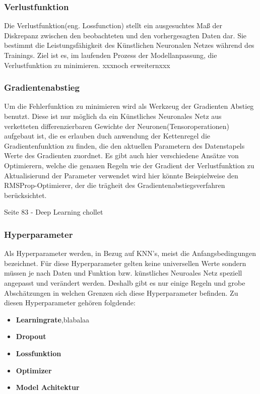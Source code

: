\subsubsection{Verlustfunktion}
Die Verlustfunktion(eng. Lossfunction) stellt ein ausgesuchtes Maß der Diskrepanz zwischen den beobachteten und den vorhergesagten Daten dar. Sie bestimmt die Leistungsfähigkeit des Künstlichen Neuronalen Netzes während des Trainings. Ziel ist es, im laufenden Prozess der Modellanpassung, die Verlustfunktion zu minimieren. xxxnoch erweiternxxx

\subsubsection{Gradientenabstieg}
Um die Fehlerfunktion zu minimieren wird als Werkzeug der Gradienten Abstieg benutzt. Diese ist nur möglich da ein Künstliches Neuronales Netz aus verketteten differenzierbaren Gewichte der Neuronen(Tensoroperationen) aufgebaut ist, die es erlauben duch anwendung der Kettenregel die Gradientenfunktion zu finden, die den aktuellen Parametern des Datenstapels Werte des Gradienten zuordnet. Es gibt auch hier verschiedene Ansätze von Optimierern, welche die genauen Regeln wie der Gradient der Verlustfunktion zu Aktualisierund der Parameter verwendet wird hier könnte Beispielweise den RMSProp-Optimierer, der die trägheit des Gradientenabstiegsverfahren berücksichtet.

Seite 83 - Deep Learning chollet

\subsubsection{Hyperparameter}
Als Hyperparameter werden, in Bezug auf KNN's, meist die Anfangsbedingungen bezeichnet. 
Für diese Hyperparameter gelten keine universellen Werte sondern müssen je nach Daten und Funktion bzw. künstliches Neuroales Netz speziell angepasst und verändert werden. Deshalb gibt es nur einige Regeln und grobe Abschätzungen in welchen Grenzen sich diese Hyperparameter befinden. Zu diesen Hyperparameter gehören folgdende:
\begin{itemize}
\item \textbf{Learningrate},blabalaa
\item \textbf{Dropout}
\item \textbf{Lossfunktion}
\item \textbf{Optimizer}
\item \textbf{Model Achitektur}
\end{itemize}

